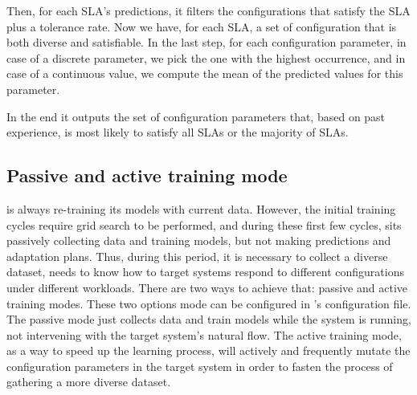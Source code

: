Then, for each SLA's predictions, it filters the configurations that satisfy the SLA plus a tolerance rate. Now we have, for each SLA, a set of configuration that is both diverse and satisfiable. In the last step, for each configuration parameter, in case of a discrete parameter, we pick the one with the highest occurrence, and in case of a continuous value, we compute the mean of the predicted values for this parameter.

In the end it outputs the set of configuration parameters that, based on past experience, is most likely to satisfy all SLAs or the majority of SLAs.

\subsection{Passive and active training mode}

\projectname{} is always re-training its models with current data. However, the initial training cycles require grid search to be performed, and during these first few cycles, \projectname{} sits passively collecting data and training models, but not making predictions and adaptation plans. Thus, during this period, it is necessary to collect a diverse dataset, \projectname{} needs to know how to target systems respond to different configurations under different workloads. There are two ways to achieve that: passive and active training modes. These two options mode can be configured in \projectname{}'s configuration file. The passive mode just collects data and train models while the system is running, not intervening with the target system's natural flow. The active training mode, as a way to speed up the learning process, \projectname{} will actively and frequently mutate the configuration parameters in the target system in order to fasten the process of gathering a more diverse dataset.




